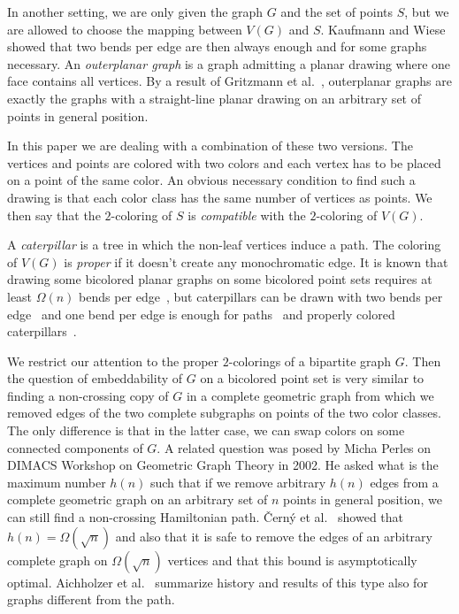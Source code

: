 \documentclass[12pt]{article}
\begin{document}
In another setting, we are only given the graph $G$ and the set of points $S$, but we
are allowed to choose the mapping between $V(G)$ and $S$.
Kaufmann and Wiese~\cite{kaufmannwiese} showed that two bends per edge are then always enough 
and for some graphs necessary. An \emph{outerplanar graph} is a graph admitting a planar drawing 
where one face contains all vertices. By a result of Gritzmann et al.~\cite{gritzmann91}, 
outerplanar graphs are exactly the graphs with a straight-line planar drawing on 
an arbitrary set of points in general position.

In this paper we are dealing with a combination of these two versions. The vertices and
points are colored with two colors and each vertex has to be placed on a point of the 
same color. An obvious necessary condition to find such a drawing is that each color class
has the same number of vertices as points. 
We then say that the $2$-coloring of $S$ is \emph{compatible} with the $2$-coloring of $V(G)$.

A \emph{caterpillar} is a tree in which the non-leaf vertices induce a path. 
The coloring of $V(G)$ is \emph{proper} if it doesn't create any monochromatic edge.
It is known that drawing some bicolored planar graphs on some bicolored point sets requires 
at least $\Omega(n)$ bends per edge~\cite{giacomograph},
but caterpillars can be drawn with two bends per edge~\cite{giacomograph} and one bend per
edge is enough for paths~\cite{giacomopath} and properly colored caterpillars~\cite{giacomograph}.

We restrict our attention to the proper $2$-colorings of a bipartite graph $G$. Then 
the question of embeddability of $G$ on a bicolored point set is very similar to finding a non-crossing
copy of $G$ in a complete geometric graph from which we removed edges of the two complete subgraphs
on points of the two color classes. 
The only difference is that in the latter case, we can swap colors on some connected components of $G$.
A related question was posed by Micha Perles on DIMACS Workshop on Geometric Graph Theory in 2002.
He asked what is the maximum number $h(n)$ such that if we remove arbitrary $h(n)$ edges  
from a complete geometric graph on an arbitrary set of $n$ points in general position, we
can still find a non-crossing Hamiltonian path.
\v{C}ern\'y et al.~\cite{cerny07} showed that $h(n) = \Omega(\sqrt{n})$
and also that it is safe to remove the edges of an arbitrary complete graph
on $\Omega(\sqrt{n})$ vertices and that this bound is asymptotically optimal. 
Aichholzer et al.~\cite{aichholzer10} summarize history and results of this type also for
graphs different from the path.
\end{document}
